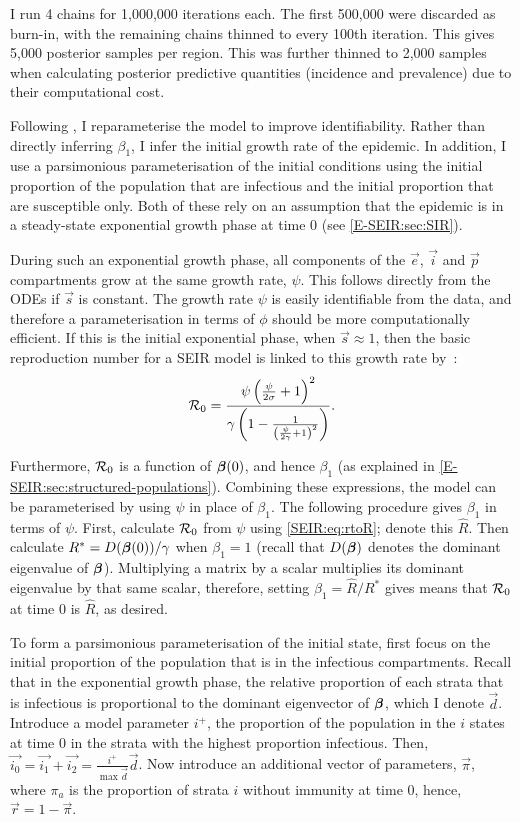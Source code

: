 \documentclass[thesis.tex]{subfiles}
\begin{document}
I run 4 chains for 1,000,000 iterations each.
The first 500,000 were discarded as burn-in, with the remaining chains thinned to every 100th iteration.
This gives 5,000 posterior samples per region.
This was further thinned to 2,000 samples when calculating posterior predictive quantities (incidence and prevalence) due to their computational cost.

Following \textcite{birrellBayesian}, I reparameterise the model to improve identifiability.
Rather than directly inferring $\beta_1$, I infer the initial growth rate of the epidemic.
In addition, I use a parsimonious parameterisation of the initial conditions using the initial proportion of the population that are infectious and the initial proportion that are susceptible only.
Both of these rely on an assumption that the epidemic is in a steady-state exponential growth phase at time 0 (see \cref{E-SEIR:sec:SIR}).

During such an exponential growth phase, all components of the $\vec{e}$, $\vec{i}$ and $\vec{p}$ compartments grow at the same growth rate, $\psi$.
This follows directly from the ODEs if $\vec{s}$ is constant. 
The growth rate $\psi$ is easily identifiable from the data, and therefore a parameterisation in terms of $\phi$ should be more computationally efficient.
If this is the initial exponential phase, when $\vec{s} \approx 1$, then the basic reproduction number for a SEIR model is linked to this growth rate by~\autocites{birrellBayesian}{wearingAppropriate}:
\begin{align}
    \mathcal{R}_{0} = \frac{\psi \left( \frac{\psi}{2\sigma} + 1 \right)^2}{\gamma \left(1 - \frac{1}{\left(\frac{\psi}{2 \gamma} + 1 \right)^2} \right)} \label{SEIR:eq:rtoR}.
\end{align}

Furthermore, $\mathcal{R}_{0}$ is a function of $\bm{\beta}(0)$, and hence $\beta_1$ (as explained in \cref{E-SEIR:sec:structured-populations}).
Combining these expressions, the model can be parameterised by using $\psi$ in place of $\beta_1$.
The following procedure gives $\beta_1$ in terms of $\psi$.
First, calculate $\mathcal{R}_{0}$ from $\psi$ using \cref{SEIR:eq:rtoR}; denote this $\hat{R}$.
Then calculate $R^* = D(\bm{\beta}(0)) / \gamma$ when $\beta_1=1$ (recall that $D(\bm{\beta})$ denotes the dominant eigenvalue of $\bm{\beta}$).
Multiplying a matrix by a scalar multiplies its dominant eigenvalue by that same scalar, therefore, setting $\beta_1 = \hat{R} / R^*$ gives means that $\mathcal{R}_{0}$ at time 0 is $\hat{R}$, as desired.

To form a parsimonious parameterisation of the initial state, first focus on the initial proportion of the population that is in the infectious compartments.
Recall that in the exponential growth phase, the relative proportion of each strata that is infectious is proportional to the dominant eigenvector of $\bm{\beta}$, which I denote $\vec{d}$.
Introduce a model parameter $i^+$, the proportion of the population in the $i$ states at time 0 in the strata with the highest proportion infectious.
Then, $\vec{i_0} = \vec{i_1} + \vec{i_2} = \frac{i^+}{\max \vec{d}} \vec{d}$.
Now introduce an additional vector of parameters, $\vec{\pi}$, where $\pi_a$ is the proportion of strata $i$ without immunity at time 0, hence, $\vec{r} = 1 - \vec{\pi}$.
\end{document}
